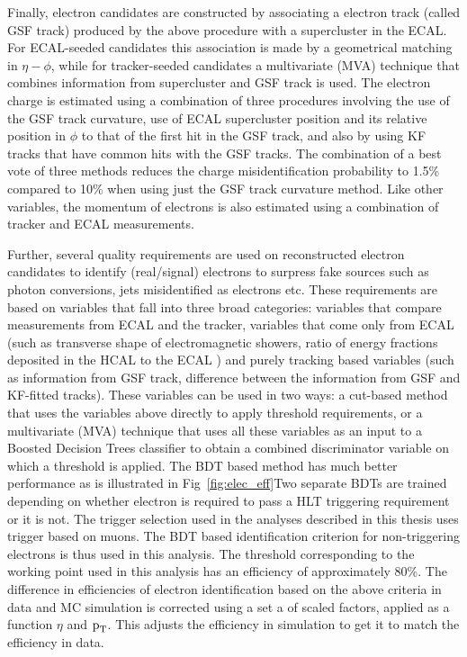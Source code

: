 Finally, electron candidates are constructed by associating a electron track (called GSF track) produced by the above procedure with a supercluster in the ECAL. For ECAL-seeded candidates this association is made by a geometrical matching in $\eta-\phi$, while for tracker-seeded candidates a multivariate (MVA) technique that combines information from supercluster and GSF track is used. The electron charge is estimated using a combination of three procedures involving the use of the GSF track curvature, use of ECAL supercluster position and its relative position in $\phi$ to that of the first hit in the GSF track, and also by using KF tracks that have common hits with the GSF tracks. The combination of a best vote of three methods reduces the charge misidentification probability to 1.5\%  compared to 10\% when using just the GSF track curvature method. Like other variables, the momentum of electrons is also estimated using a combination of tracker and ECAL measurements.


Further, several quality requirements are used on reconstructed electron candidates to identify (real/signal) electrons to surpress fake sources such as photon conversions, jets misidentified as electrons etc.
These requirements are based on variables that fall into three broad categories: variables that compare measurements from ECAL and the tracker, variables that come only from ECAL (such as transverse shape of electromagnetic showers, ratio of energy fractions deposited in the HCAL to the ECAL ) and purely tracking based variables (such as information from GSF track, difference between the information from GSF and KF-fitted tracks). These variables can be used in two ways: a cut-based method that uses the variables above directly to apply threshold requirements, or a multivariate (MVA) technique that uses all these variables as an input to a Boosted Decision Trees classifier to obtain a combined discriminator variable on which a threshold is applied. The BDT based method has much better performance as is illustrated in Fig~\ref{fig:elec_eff}Two separate BDTs are trained depending on whether electron is required to pass a HLT triggering requirement or it is not. The trigger selection used in the analyses described in this thesis uses trigger based on muons. The BDT based identification criterion for non-triggering electrons is thus used in this analysis. The threshold corresponding to the working point used in this analysis has an efficiency of approximately 80\%. The difference in efficiencies  of electron identification based on the above criteria in data and MC simulation is corrected using a set a of scaled factors, applied as a function $\eta$ and $\text{p}_\text{T}$. This adjusts the efficiency in simulation to get it to match the efficiency in data.  
   

